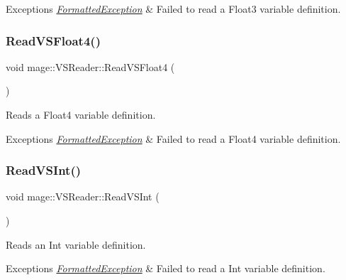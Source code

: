 \begin{DoxyExceptions}{Exceptions}
{\em \hyperlink{structmage_1_1_formatted_exception}{Formatted\+Exception}} & Failed to read a Float3 variable definition. \\
\hline
\end{DoxyExceptions}
\hypertarget{classmage_1_1_v_s_reader_aa1230cf0d6305f98172aabeacbfef8e0}{}\label{classmage_1_1_v_s_reader_aa1230cf0d6305f98172aabeacbfef8e0} 
\subsubsection{\texorpdfstring{Read\+V\+S\+Float4()}{ReadVSFloat4()}}
{\footnotesize\ttfamily void mage\+::\+V\+S\+Reader\+::\+Read\+V\+S\+Float4 (\begin{DoxyParamCaption}{ }\end{DoxyParamCaption})\hspace{0.3cm}{\ttfamily [private]}}

Reads a Float4 variable definition.


\begin{DoxyExceptions}{Exceptions}
{\em \hyperlink{structmage_1_1_formatted_exception}{Formatted\+Exception}} & Failed to read a Float4 variable definition. \\
\hline
\end{DoxyExceptions}
\hypertarget{classmage_1_1_v_s_reader_abbb6176a73ebddd88fc3ed58c89aa01a}{}\label{classmage_1_1_v_s_reader_abbb6176a73ebddd88fc3ed58c89aa01a} 
\subsubsection{\texorpdfstring{Read\+V\+S\+Int()}{ReadVSInt()}}
{\footnotesize\ttfamily void mage\+::\+V\+S\+Reader\+::\+Read\+V\+S\+Int (\begin{DoxyParamCaption}{ }\end{DoxyParamCaption})\hspace{0.3cm}{\ttfamily [private]}}

Reads an Int variable definition.


\begin{DoxyExceptions}{Exceptions}
{\em \hyperlink{structmage_1_1_formatted_exception}{Formatted\+Exception}} & Failed to read a Int variable definition. \\
\hline
\end{DoxyExceptions}
\hypertarget{classmage_1_1_v_s_reader_a4a3b90b47cb5e262a72df719674b9d93}{}\label{classmage_1_1_v_s_reader_a4a3b90b47cb5e262a72df719674b9d93} 
